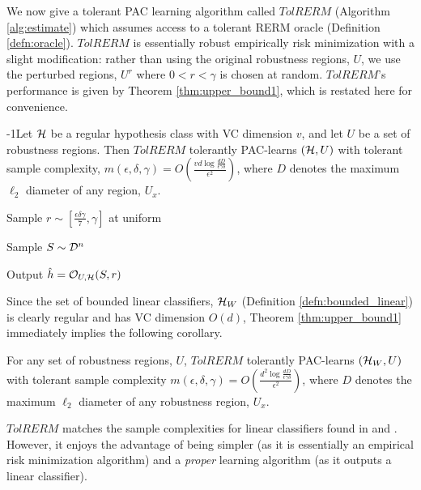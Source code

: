  We now give a tolerant PAC learning algorithm called $TolRERM$ (Algorithm \ref{alg:estimate}) which assumes access to a tolerant RERM oracle (Definition \ref{defn:oracle}). $TolRERM$ is essentially robust empirically risk minimization with a slight modification: rather than using the original robustness regions, $U$, we use the perturbed regions, $U^r$ where $0 < r < \gamma$ is chosen at random. $TolRERM$'s performance is given by Theorem \ref{thm:upper_bound1}, which is restated here for convenience. 
\begin{thm}
\looseness-1Let $\mathcal H$ be a regular hypothesis class with VC dimension $v$, and let $U$ be a set of robustness regions. Then $TolRERM$ tolerantly PAC-learns $(\mathcal H, U)$ with tolerant sample complexity, $m(\epsilon, \delta, \gamma)  = O\left( \frac{vd\log \frac{dD}{\epsilon\gamma\delta}}{\epsilon^2}\right)$, where $D$ denotes the maximum $\ell_2$ diameter of any region, $U_x$. 
\end{thm}
\vspace{-2mm}
\begin{algorithm}
   \caption{$TolRERM(\cD, \epsilon, \delta, \gamma, n)$}
   \label{alg:estimate}

   Sample $r \sim [\frac{\epsilon\delta\gamma}{7}, \gamma]$ at uniform\;
   
   Sample $S \sim \mathcal D^n$\;
    
   Output $\hat{h} = \mathcal O_{U, \mathcal H}(S, r)$\;

\end{algorithm}
\vspace{-2mm}
Since the set of bounded linear classifiers, $\mathcal H_W$ (Definition \ref{defn:bounded_linear}) is clearly regular and has VC dimension $O(d)$, Theorem \ref{thm:upper_bound1} immediately implies the following corollary. 

\begin{cor}
For any set of robustness regions, $U$, $TolRERM$ tolerantly PAC-learns $(\mathcal H_W, U)$ with tolerant sample complexity $m(\epsilon, \delta, \gamma) = O\left( \frac{d^2\log \frac{dD}{\epsilon\gamma\delta}}{\epsilon^2}\right)$, where $D$ denotes the maximum $\ell_2$ diameter of any robustness region, $U_x$.  
\end{cor}

$TolRERM$ matches the sample complexities for linear classifiers found in \cite{Srebro19} and \cite{Urner22}. However, it enjoys the advantage of being simpler (as it is essentially an empirical risk minimization algorithm) and a \textit{proper} learning algorithm (as it outputs a linear classifier). 






